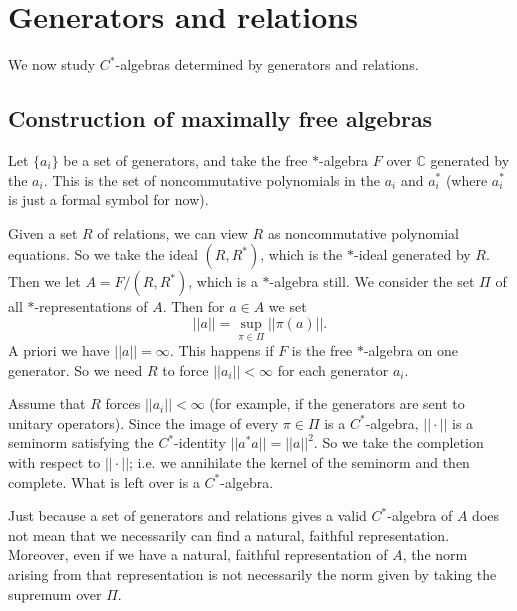 \documentclass[12pt]{report}
\newcommand{\CC}{\mathbb{C}}
\theoremstyle{definition}
\begin{document}
\chapter{Generators and relations}
We now study $C^*$-algebras determined by generators and relations.

\section{Construction of maximally free algebras}
Let $\{a_i\}$ be a set of generators, and take the free $*$-algebra $F$ over $\CC$ generated by the $a_i$. This is the set of noncommutative polynomials in the $a_i$ and $a_i^*$ (where $a_i^*$ is just a formal symbol for now).

Given a set $R$ of relations, we can view $R$ as noncommutative polynomial equations. So we take the ideal $(R, R^*)$, which is the $*$-ideal generated by $R$. Then we let $A = F/(R, R^*)$, which is a $*$-algebra still. We consider the set $\Pi$ of all $*$-representations of $A$. Then for $a \in A$ we set
$$||a|| = \sup_{\pi \in \Pi} ||\pi(a)||.$$
A priori we have $||a|| = \infty$. This happens if $F$ is the free $*$-algebra on one generator. So we need $R$ to force $||a_i|| < \infty$ for each generator $a_i$.

Assume that $R$ forces $||a_i|| < \infty$ (for example, if the generators are sent to unitary operators). Since the image of every $\pi \in \Pi$ is a $C^*$-algebra, $||\cdot||$ is a seminorm satisfying the $C^*$-identity $||a^*a|| = ||a||^2$. So we take the completion with respect to $||\cdot||$; i.e. we annihilate the kernel of the seminorm and then complete. What is left over is a $C^*$-algebra.

Just because a set of generators and relations gives a valid $C^*$-algebra of $A$ does not mean that we necessarily can find a natural, faithful representation. Moreover, even if we have a natural, faithful representation of $A$, the norm arising from that representation is not necessarily the norm given by taking the supremum over $\Pi$.
\end{document}
